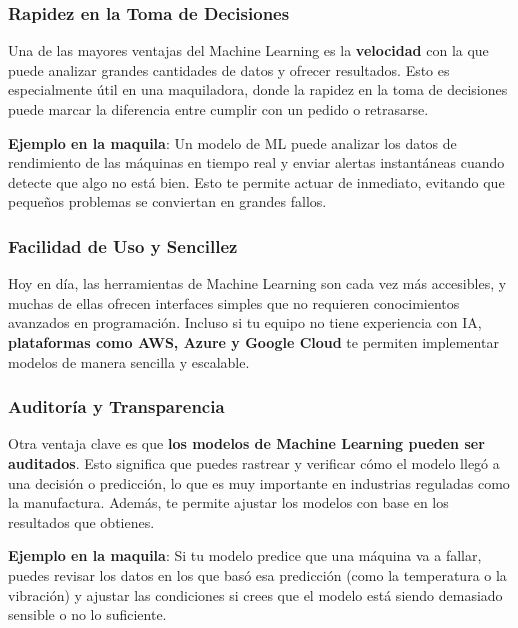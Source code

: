 \documentclass[
  10pt,
  letterpaper,
]{book}
\begin{document}
\subsubsection{\texorpdfstring{\textbf{Rapidez en la Toma de
Decisiones}}{Rapidez en la Toma de Decisiones}}\label{rapidez-en-la-toma-de-decisiones}

Una de las mayores ventajas del Machine Learning es la
\textbf{velocidad} con la que puede analizar grandes cantidades de datos
y ofrecer resultados. Esto es especialmente útil en una maquiladora,
donde la rapidez en la toma de decisiones puede marcar la diferencia
entre cumplir con un pedido o retrasarse.

\textbf{Ejemplo en la maquila}: Un modelo de ML puede analizar los datos
de rendimiento de las máquinas en tiempo real y enviar alertas
instantáneas cuando detecte que algo no está bien. Esto te permite
actuar de inmediato, evitando que pequeños problemas se conviertan en
grandes fallos.

\subsubsection{\texorpdfstring{\textbf{Facilidad de Uso y
Sencillez}}{Facilidad de Uso y Sencillez}}\label{facilidad-de-uso-y-sencillez}

Hoy en día, las herramientas de Machine Learning son cada vez más
accesibles, y muchas de ellas ofrecen interfaces simples que no
requieren conocimientos avanzados en programación. Incluso si tu equipo
no tiene experiencia con IA, \textbf{plataformas como AWS, Azure y
Google Cloud} te permiten implementar modelos de manera sencilla y
escalable.

\subsubsection{\texorpdfstring{\textbf{Auditoría y
Transparencia}}{Auditoría y Transparencia}}\label{auditoruxeda-y-transparencia}

Otra ventaja clave es que \textbf{los modelos de Machine Learning pueden
ser auditados}. Esto significa que puedes rastrear y verificar cómo el
modelo llegó a una decisión o predicción, lo que es muy importante en
industrias reguladas como la manufactura. Además, te permite ajustar los
modelos con base en los resultados que obtienes.

\textbf{Ejemplo en la maquila}: Si tu modelo predice que una máquina va
a fallar, puedes revisar los datos en los que basó esa predicción (como
la temperatura o la vibración) y ajustar las condiciones si crees que el
modelo está siendo demasiado sensible o no lo suficiente.
\end{document}
